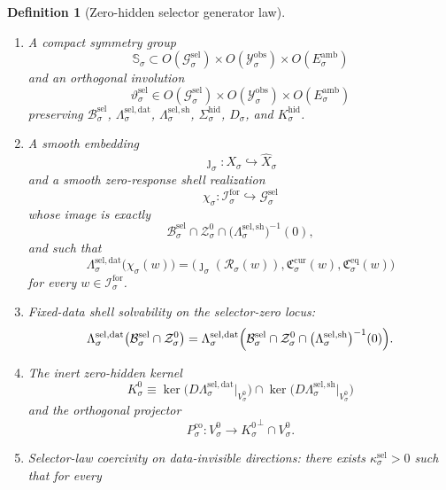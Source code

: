 \documentclass[11pt]{article}
\newcommand{\ForSpace}[1]{\mathcal I_{#1}^{\mathrm{for}}}
\newcommand{\Reduction}[1]{\mathcal R_{#1}}
\newcommand{\CurrentCarrier}[1]{\mathfrak C_{#1}^{\mathrm{cur}}}
\newcommand{\EqCarrier}[1]{\mathfrak C_{#1}^{\mathrm{eq}}}
\newcommand{\VisibleAffine}[1]{\widehat X_{#1}}
\newcommand{\DataSpace}[1]{\mathcal Y_{#1}^{\mathrm{obs}}}
\newcommand{\AmbientTarget}[1]{E_{#1}^{\mathrm{amb}}}
\newcommand{\GenSpace}[1]{\mathcal G_{#1}^{\mathrm{sel}}}
\newcommand{\GenBody}[1]{\mathcal B_{#1}^{\mathrm{sel}}}
\newcommand{\GenData}[1]{\Lambda_{#1}^{\mathrm{sel,dat}}}
\newcommand{\GenShell}[1]{\Lambda_{#1}^{\mathrm{sel,sh}}}
\newcommand{\HiddenSel}[1]{\Sigma_{#1}^{\mathrm{hid}}}
\newcommand{\ZeroHiddenSlice}[1]{\mathcal Z_{#1}^{0}}
\newcommand{\ZeroHiddenVec}[1]{V_{#1}^{0}}
\newcommand{\GapSpace}[1]{H_{#1}}
\newcommand{\GapBody}[1]{D_{#1}}
\newcommand{\HiddenOperator}[1]{K_{#1}^{\mathrm{hid}}}
\newcommand{\GenSym}[1]{\mathbb S_{#1}}
\newcommand{\GenTime}[1]{\vartheta_{#1}^{\mathrm{sel}}}
\newcommand{\GenEmbed}[1]{\chi_{#1}}
\newcommand{\Kernel}[1]{K_{#1}^{0}}
\newcommand{\StateComp}[1]{P_{#1}^{\mathrm{co}}}
\newtheorem{definition}{Definition}
\begin{document}
\begin{definition}[Zero-hidden selector generator law]
\begin{enumerate}
\begin{equation}
    \kappa_{\sigma}^{\mathrm{hid}}\,
    \|\eta\|^{2}
    \qquad
    \text{for all }\eta\in\GapSpace{\sigma}
    \label{eq:gengap}
    \end{equation}
    for some \(\kappa_{\sigma}^{\mathrm{hid}}>0\).
    \item A compact symmetry group
    \[
    \GenSym{\sigma}\subset
    O(\GenSpace{\sigma})\times
    O(\DataSpace{\sigma})\times
    O(\AmbientTarget{\sigma})
    \]
    and an orthogonal involution
    \[
    \GenTime{\sigma}\in
    O(\GenSpace{\sigma})\times
    O(\DataSpace{\sigma})\times
    O(\AmbientTarget{\sigma})
    \]
    preserving \(\GenBody{\sigma}\), \(\GenData{\sigma}\), \(\GenShell{\sigma}\), \(\HiddenSel{\sigma}\), \(\GapBody{\sigma}\), and \(\HiddenOperator{\sigma}\).
    \item A smooth embedding
    \[
    \jmath_{\sigma}:X_{\sigma}\hookrightarrow\VisibleAffine{\sigma}
    \]
    and a smooth zero-response shell realization
    \[
    \GenEmbed{\sigma}:\ForSpace{\sigma}\hookrightarrow\GenSpace{\sigma}
    \]
    whose image is exactly
    \[
    \GenBody{\sigma}\cap
    \ZeroHiddenSlice{\sigma}\cap
    \bigl(\GenShell{\sigma}\bigr)^{-1}(0),
    \]
    and such that
    \begin{equation}
    \GenData{\sigma}\bigl(\GenEmbed{\sigma}(w)\bigr)
    =
    \bigl(
    \jmath_{\sigma}(\Reduction{\sigma}(w)),
    \CurrentCarrier{\sigma}(w),
    \EqCarrier{\sigma}(w)
    \bigr)
    \label{eq:gencompat}
    \end{equation}
    for every \(w\in\ForSpace{\sigma}\).
    \item Fixed-data shell solvability on the selector-zero locus:
    \begin{equation}
    \GenData{\sigma}\bigl(
    \GenBody{\sigma}\cap\ZeroHiddenSlice{\sigma}
    \bigr)
    =
    \GenData{\sigma}\Bigl(
    \GenBody{\sigma}\cap
    \ZeroHiddenSlice{\sigma}\cap
    \bigl(\GenShell{\sigma}\bigr)^{-1}(0)
    \Bigr).
    \label{eq:gensolvability}
    \end{equation}
    \item The inert zero-hidden kernel
    \[
    \Kernel{\sigma}
    \equiv
    \ker\bigl(D\GenData{\sigma}\big|_{\ZeroHiddenVec{\sigma}}\bigr)
    \cap
    \ker\bigl(D\GenShell{\sigma}\big|_{\ZeroHiddenVec{\sigma}}\bigr)
    \]
    and the orthogonal projector
    \[
    \StateComp{\sigma}:
    \ZeroHiddenVec{\sigma}\to
    {\Kernel{\sigma}}^{\perp}\cap\ZeroHiddenVec{\sigma}.
    \]
    \item Selector-law coercivity on data-invisible directions: there exists \(\kappa_{\sigma}^{\mathrm{sel}}>0\) such that for every

\end{enumerate}
\end{definition}
\end{document}
